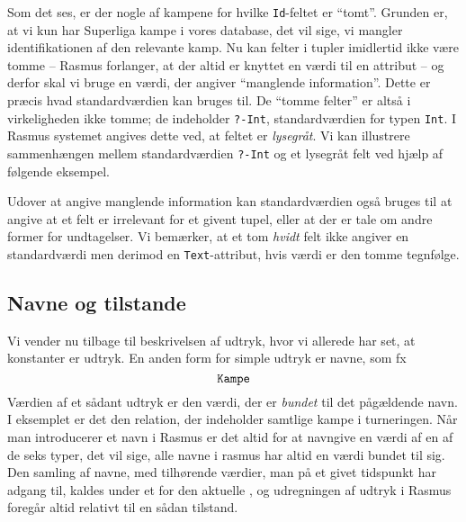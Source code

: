 \documentclass{article}
\newcounter{eks}
\begin{document}
Som det ses, er der nogle af kampene for hvilke \verb"Id"-feltet
er ``tomt''. Grunden er, at vi kun har Superliga kampe i vores
database, det vil sige, vi mangler identifikationen af den relevante
kamp. Nu kan felter i tupler imidlertid ikke v\ae{}re tomme --
{\sc Rasmus} forlanger, at der altid er knyttet en v\ae{}rdi til
en attribut -- og derfor skal vi bruge en v\ae{}rdi, der angiver
``manglende information''. Dette er pr\ae{}cis hvad standardv\ae{}rdien
kan bruges til. De ``tomme felter'' er alts\aa{} i virkeligheden ikke
tomme; de indeholder \verb"?-Int", standardv\ae{}rdien for typen \verb"Int".
I {\sc Rasmus} systemet angives dette ved, at feltet er {\em lysegr\aa{}t}.
Vi kan illustrere sammenh\ae{}ngen mellem standardv\ae{}rdien
\verb"?-Int" og et lysegr\aa{}t felt ved hj\ae{}lp af f\o{}lgende eksempel.


Udover at angive manglende information kan standardv\ae{}rdien
ogs\aa{} brug\-es til at angive at et felt er irrelevant for et
givent tupel, eller at der er tale om andre former for undtagelser.
Vi bem\ae{}rker, at et tom {\em hvidt\/} felt ikke angiver en
standardv\ae{}rdi men derimod en \verb"Text"-attribut, hvis v\ae{}rdi
er den tomme tegnf\o{}lge.

\subsection{Navne og tilstande}
Vi vender nu tilbage til beskrivelsen af udtryk, hvor vi allerede har
set, at konstanter er udtryk. En anden form for simple udtryk er navne,
som fx
$$ \mbox{\tt Kampe} $$
V\ae{}rdien af et s\aa{}dant udtryk er den v\ae{}rdi, der er {\em bundet\/}
til det p\aa{}\-g\ae{}ld\-en\-de navn. I eksemplet er det den relation,
der indeholder samtlige kampe i turneringen. N\aa{}r man introducerer et
navn i {\sc Rasmus} er det altid for at navngive en v\ae{}rdi af en af
de seks typer, det vil sige, alle navne i {\sc rasmus} har altid
en v\ae{}rdi bundet til sig. Den samling af navne, med tilh\o{}rende
v\ae{}rdier, man p\aa{} et givet tidspunkt har adgang til, kaldes
under et for den aktuelle {\em {}}, og udregningen af udtryk i
{\sc Rasmus} foreg\aa{}r altid relativt til en s\aa{}dan tilstand.
\end{document}
